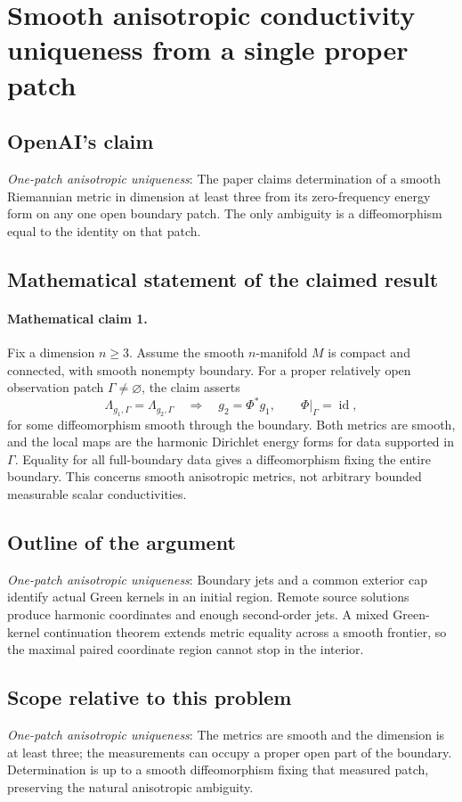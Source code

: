 \documentclass[11pt]{article}
\begin{document}
\section*{Smooth anisotropic conductivity uniqueness from a single proper patch}

\subsection{OpenAI's claim}
\textit{One-patch anisotropic uniqueness}: The paper claims determination of a smooth Riemannian metric in dimension at least three from its zero-frequency energy form on any one open boundary patch. The only ambiguity is a diffeomorphism equal to the identity on that patch.

\subsection{Mathematical statement of the claimed result}
\paragraph{Mathematical claim 1.} Fix a dimension $n\ge3$. Assume the smooth $n$-manifold $M$ is compact and connected, with smooth nonempty boundary. For a proper relatively open observation patch $\Gamma\ne\varnothing$, the claim asserts \[\Lambda_{g_1,\Gamma}=\Lambda_{g_2,\Gamma}\quad\Longrightarrow\quad g_2=\Phi^*g_1,\qquad\Phi|_\Gamma=\operatorname{id},\] for some diffeomorphism smooth through the boundary. Both metrics are smooth, and the local maps are the harmonic Dirichlet energy forms for data supported in $\Gamma$. Equality for all full-boundary data gives a diffeomorphism fixing the entire boundary. This concerns smooth anisotropic metrics, not arbitrary bounded measurable scalar conductivities.

\subsection{Outline of the argument}
\textit{One-patch anisotropic uniqueness}: Boundary jets and a common exterior cap identify actual Green kernels in an initial region. Remote source solutions produce harmonic coordinates and enough second-order jets. A mixed Green-kernel continuation theorem extends metric equality across a smooth frontier, so the maximal paired coordinate region cannot stop in the interior.

\subsection{Scope relative to this problem}
\textit{One-patch anisotropic uniqueness}: The metrics are smooth and the dimension is at least three; the measurements can occupy a proper open part of the boundary. Determination is up to a smooth diffeomorphism fixing that measured patch, preserving the natural anisotropic ambiguity.
\end{document}
